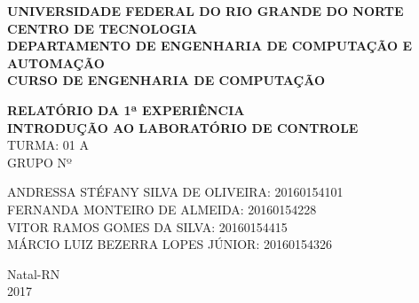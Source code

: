 \documentclass[a4paper,12pt]{article}
\begin{document}
\onehalfspacing

\thispagestyle{empty}

\setcounter{page}{1}


\begin{figure}[!ht]

\centering

\hspace{11.09cm}

\label{Logos}

\end{figure}


\vspace{-1cm}

\begin{center}
{\bf{\normalsize UNIVERSIDADE FEDERAL DO RIO GRANDE DO NORTE\\
CENTRO DE TECNOLOGIA\\
DEPARTAMENTO DE ENGENHARIA DE COMPUTAÇÃO E AUTOMAÇÃO\\
CURSO DE ENGENHARIA DE COMPUTAÇÃO
}}


\vspace{3.6cm}

{\bf{\large RELATÓRIO DA 1ª EXPERIÊNCIA\\
INTRODUÇÃO AO LABORATÓRIO DE CONTROLE\\
}}
\vspace{1.5cm}
{\large TURMA: 01 A\\
	GRUPO Nº}

\vspace{3.6cm}



\begin{flushright}
\begin{normalsize}
ANDRESSA STÉFANY SILVA DE OLIVEIRA: 20160154101\\
\vspace{0.8cm}
FERNANDA MONTEIRO DE ALMEIDA: 20160154228\\
\vspace{0.8cm}
VITOR RAMOS GOMES DA SILVA: 20160154415\\
\vspace{0.8cm}
MÁRCIO LUIZ BEZERRA LOPES JÚNIOR: 20160154326\\
\end{normalsize}
\end{flushright}


\vspace{2.5cm}

{\large Natal-RN\\
2017}

\end{center}
\end{document}
